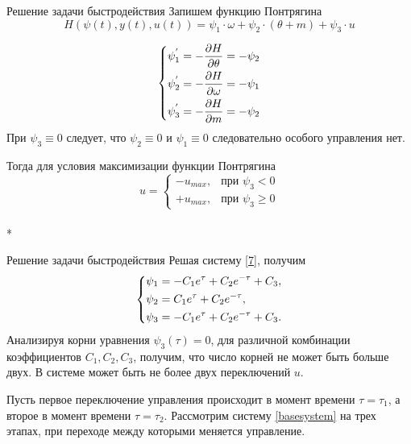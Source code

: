 \documentclass[10pt]{beamer}
\begin{document}
\begin{frame}{Решение задачи быстродействия}
	Запишем функцию Понтрягина
\[
    H(\psi(t),y(t),u(t))=\psi_1\cdot\omega+\psi_2\cdot(\theta+m)+\psi_3\cdot u
\]

\begin{equation} \label{7}
    \left\{ {\begin{aligned}
                 & \psi^{'}_1=  - \frac{{\partial H}}{{\partial \theta}} = - \psi_2\hfill  \\
                 & \psi^{'}_2=  - \frac{{\partial H}}{{\partial \omega }} = - \psi_1\hfill \\
                 & \psi^{'}_3=  - \frac{{\partial H}}{{\partial m }} = - \psi_2 \hfill     \\
            \end{aligned}} \right.
\end{equation}
При $\psi_3\equiv0$ следует, что $\psi_2\equiv0$ и $\psi_1\equiv0$ следовательно особого управления нет.

Тогда для условия максимизации функции Понтрягина
\[
    u=
    \begin{cases}
        -u_{max}, & \text{при $\psi_3<0$}          \\
        +u_{max}, & \text{при $\psi_3\geqslant 0$}
    \end{cases}
\]\\*
\end{frame}
\begin{frame}{Решение задачи быстродействия}
Решая систему \eqref{7}, получим
\[
    \left\{ {\begin{aligned}
                 & \psi_1 = -C_1e^\tau+C_2e^{-\tau}+C_3, \hfill  \\
                 & \psi_2 = C_1e^\tau+C_2e^{-\tau} , \hfill      \\
                 & \psi_3 = -C_1e^\tau+C_2e^{-\tau}+C_3 . \hfill \\
            \end{aligned}} \right.
\]
Анализируя корни уравнения $\psi_3(\tau)=0$, для различной комбинации
коэффициентов $C_1,C_2,C_3$, получим, что число корней не может быть больше двух. В системе может быть не более двух переключений $u$.

Пусть первое переключение управления происходит в момент времени
$\tau=\tau_1$, а второе в момент времени
$\tau=\tau_2$. Рассмотрим систему \eqref{basesystem} на трех этапах,
при переходе между которыми меняется управление.


\end{frame}
\end{document}
